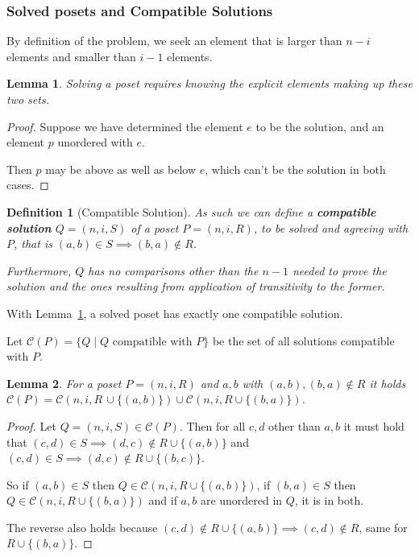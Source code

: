 \documentclass[10pt,journal,compsoc]{IEEEtran}
\newtheorem{lemma}{Lemma}
\newtheorem{definition}{Definition}
\begin{document}
\subsubsection{Solved posets and Compatible Solutions}
By definition of the problem, we seek an element that is larger than $n-i$ elements and smaller than $i - 1$ elements.

\begin{lemma}\label{lemma:partition}
  Solving a poset requires knowing the explicit elements making up these two sets.
\end{lemma}

\begin{proof}
  Suppose we have determined the element $e$ to be the solution, and an element $p$ unordered with $e$.

  Then $p$ may be above as well as below $e$, which can't be the solution in both cases.
\end{proof}

\begin{definition}[Compatible Solution]
  As such we can define a \textbf{compatible solution} $Q = (n, i, S)$ of a poset $P = (n, i, R)$, to be solved and agreeing with $P$, that is $(a, b)\in S\implies (b, a)\notin R$.

  Furthermore, $Q$ has no comparisons other than the $n - 1$ needed to prove the solution and the ones resulting from application of transitivity to the former.
\end{definition}

With Lemma~\ref{lemma:partition}, a solved poset has exactly one compatible solution.

Let $\mathcal{C}(P) = \{Q \mid Q \text{ compatible with } P\}$ be the set of all solutions compatible with $P$.

\begin{lemma}\label{lemma:compatible_union}
  For a poset $P = (n, i, R)$ and $a, b$ with $(a, b), (b, a)\notin R$ it holds $\mathcal{C}(P) = \mathcal{C}(n, i, R \, \cup \{(a, b)\}) \cup \mathcal{C}(n, i, R\cup \{(b, a)\})$.
\end{lemma}

\begin{proof}
  Let $Q = (n, i, S)\in \mathcal{C}(P)$.
  Then for all $c, d$ other than $a, b$ it must hold that $(c, d)\in S\implies (d,c)\notin R\cup \{(a, b)\}$ and $(c, d)\in S\implies (d, c)\notin R\cup \{(b, c)\}$.

  So if $(a, b)\in S$ then $Q\in\mathcal{C}(n, i, R\cup \{(a, b)\})$, if $(b, a)\in S$ then $Q\in\mathcal{C}(n, i, R\cup \{(b, a)\})$
  and if $a, b$ are unordered in $Q$, it is in both.

  The reverse also holds because $(c, d)\notin R\cup \{(a, b)\}\implies (c, d)\notin R$, same for $R\cup \{(b, a)\}$.
\end{proof}
\end{document}
